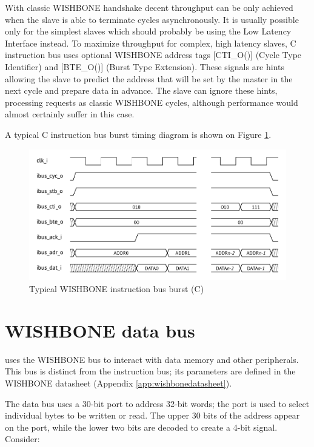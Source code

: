 \documentclass[a4paper,12pt,twoside,extrafontsizes]{memoir}
\begin{document}
With classic WISHBONE handshake decent throughput can be only achieved when the slave is able to terminate cycles asynchronously. It is usually possible only for the simplest slaves which should probably be using the Low Latency Interface instead. To maximize throughput for complex, high latency slaves, \lxp{}C instruction bus uses optional WISHBONE address tags [CTI\_O()] (Cycle Type Identifier) and [BTE\_O()] (Burst Type Extension). These signals are hints allowing the slave to predict the address that will be set by the master in the next cycle and prepare data in advance. The slave can ignore these hints, processing requests as classic WISHBONE cycles, although performance would almost certainly suffer in this case.

A typical \lxp{}C instruction bus burst timing diagram is shown on Figure \ref{fig:ibustiming}.

\begin{figure}[htbp]
	\centering
	\includegraphics[scale=0.786]{images/ibustiming.pdf}
	\caption{Typical WISHBONE instruction bus burst (\lxp{}C)}
	\label{fig:ibustiming}
\end{figure}

\section{WISHBONE data bus}

\lxp{} uses the WISHBONE bus to interact with data memory and other peripherals. This bus is distinct from the instruction bus; its parameters are defined in the WISHBONE datasheet (Appendix \ref{app:wishbonedatasheet}).

The data bus uses a 30-bit  port to address 32-bit words; the  port is used to select individual bytes to be written or read. The upper 30 bits of the address appear on the  port, while the lower two bits are decoded to create a 4-bit  signal. Consider:
\end{document}
